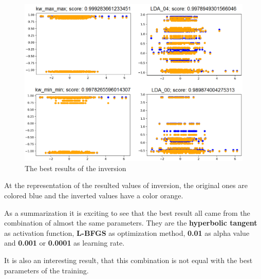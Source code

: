\begin{figure}[h]
	\centering
	\includegraphics[height=0.7\linewidth]{./figures/best_inversion}
	\caption{The best results of the inversion}
	\label{fig:best_inversion}
\end{figure}
At the representation of the resulted values of inversion, the original ones are colored blue and the inverted values have a color orange.\bigskip

As a summarization it is exciting to see that the best result all came from the combination of almost the same parameters. They are the \textbf{hyperbolic tangent} as activation function, \textbf{L-BFGS} as optimization method, \textbf{0.01} as alpha value and \textbf{0.001} or \textbf{0.0001} as learning rate.\smallskip

It is also an interesting result, that this combination is not equal with the best parameters of the training.